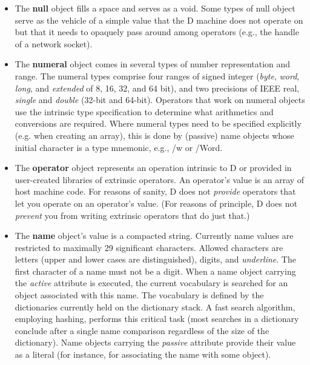 \begin{itemize}

\item The \textbf{null} object fills a space and serves as a void. Some types of null object serve as the vehicle of a simple value that the D machine does not operate on but that it needs to opaquely pass around among operators (e.g., the handle of a network socket).

\item The  \textbf{numeral} object comes in several types of number representation and range. The  numeral types comprise four ranges of signed integer (\emph{byte}, \emph{word}, \emph{long}, and \emph{extended} of 8, 16, 32, and 64 bit), and two precisions of IEEE real, \emph{single} and \emph{double} (32-bit and 64-bit). Operators that work on  numeral  objects use the intrinsic type specification to determine what arithmetics and conversions are required.  Where numeral types need to  be specified explicitly (e.g. when creating an array),  this is done by (passive) name objects whose  initial character is a type mnemonic, e.g., /w or /Word.

\item The \textbf{operator} object represents an operation intrinsic to D or  provided in user-created libraries of extrinsic operators. An operator's value is an array of host machine code. For reasons of sanity, D does not \emph{provide} operators that let you operate on an operator's value. (For reasons of principle, D does not \emph{prevent} you from writing extrinsic operators that do just that.)

\item The  \textbf{name} object's value is a compacted string. Currently name values are restricted to maximally 29 significant characters. Allowed characters are letters (upper and lower cases are distinguished), digits, and \emph{underline}. The first character of a name must not be a digit. When a name  object carrying the \emph{active} attribute is executed, the current vocabulary is searched  for an object associated with this name. The vocabulary is defined by the dictionaries currently held on the dictionary stack. A fast search  algorithm,  employing hashing,  performs  this  critical task (most searches in a dictionary conclude  after  a single name comparison regardless of the size of the dictionary). Name objects carrying the \emph{passive} attribute provide their value as a literal (for instance, for associating the name with some object).


\end{itemize}
